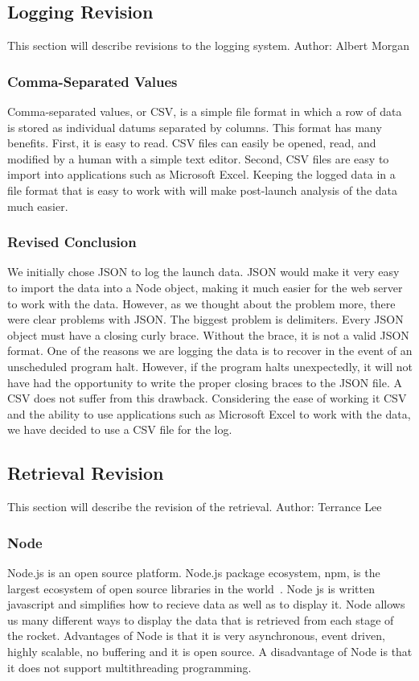 \documentclass[10pt,draftclsnofoot,onecolumn]{IEEEtran}
\begin{document}
	\subsection{Logging Revision}
	This section will describe revisions to the logging system. Author: Albert Morgan

	\subsubsection{Comma-Separated Values}
	Comma-separated values, or CSV, is a simple file format in which a row of data is stored as individual datums separated by columns.
	This format has many benefits.
	First, it is easy to read.
	CSV files can easily be opened, read, and modified by a human with a simple text editor.
	Second, CSV files are easy to import into applications such as Microsoft Excel.
	Keeping the logged data in a file format that is easy to work with will make post-launch analysis of the data much easier.


	\subsubsection{Revised Conclusion}
	We initially chose JSON to log the launch data.
	JSON would make it very easy to import the data into a Node object,
	making it much easier for the web server to work with the data.
	However, as we thought about the problem more, there were clear problems with JSON.
	The biggest problem is delimiters.
	Every JSON object must have a closing curly brace.
	Without the brace, it is not a valid JSON format.
	One of the reasons we are logging the data is to recover in the event of an unscheduled program halt.
	However, if the program halts unexpectedly, it will not have had the opportunity to write the proper closing braces to the JSON file.
	A CSV does not suffer from this drawback.
	Considering the ease of working it CSV and the ability to use applications such as Microsoft Excel to work with the data,
	we have decided to use a CSV file for the log.

	\subsection{Retrieval Revision}
	This section will describe the revision of the retrieval.  Author:  Terrance Lee
	\subsubsection{Node}
   	Node.js is an open source platform.  Node.js package ecosystem, npm, is the largest ecosystem of open source libraries in the 
	world~\cite{node}. Node js is written javascript and simplifies how to recieve data as well as to display it.  Node allows us
	many different ways to display the data that is retrieved from each stage of the rocket.  Advantages of Node is that it is very 
	asynchronous, event driven, highly scalable, no buffering and it is open source.  A disadvantage of Node is that it does not
	support multithreading programming. 
	
\end{document}
